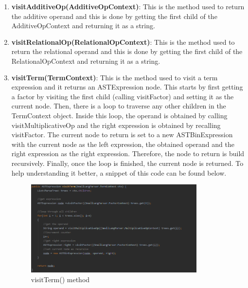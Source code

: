 \documentclass{article}
\begin{document}
\begin{enumerate}
					\item \textbf{visitAdditiveOp(AdditiveOpContext)}: This is the method used to return the additive operand and this is done by getting the first child of the AdditiveOpContext and returning it as a string.
					
					\item \textbf{visitRelationalOp(RelationalOpContext)}: This is the method used to return the relational operand and this is done by getting the first child of the RelationalOpContext and returning it as a string.
					
					\item \textbf{visitTerm(TermContext)}:  This is the method used to visit a term expression and it returns an ASTExpression node. This starts by first getting a factor by visiting the first child (calling visitFactor) and setting it as the current node. Then, there is a loop to traverse any other children in the TermContext object. Inside this loop, the operand is obtained by calling visitMultiplicativeOp and the right expression is obtained by recalling visitFactor. The current node to return is set to a new ASTBinExpression with the current node as the left expression, the obtained operand and the right expression as the right expression. Therefore, the node to return is build recursively. Finally, once the loop is finished, the current node is returned. To help understanding it better, a snippet of this code can be found below.
					
										\begin{figure}[H]
					\centering
			 			\includegraphics[width=0.85\textwidth]{transformerterm.png}
			  			\caption{visitTerm() method}
			  			\label{fig:transformerterm}
					\end{figure}
					

\end{enumerate}
\end{document}
